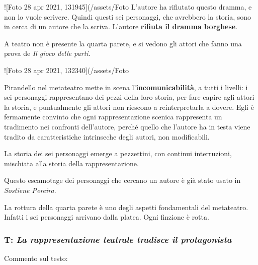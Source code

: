 ![Foto 28 apr 2021, 131945](/assets/Foto%
L’autore ha rifiutato questo dramma, e non lo vuole scrivere. Quindi questi sei personaggi, che avrebbero la storia, sono in cerca di un autore che la scriva. L’autore \textbf{rifiuta il dramma borghese}.

A teatro non è presente la quarta parete, e si vedono gli attori che fanno una prova de \textit{Il gioco delle parti}.

![Foto 28 apr 2021, 132340](/assets/Foto%

Pirandello nel metateatro mette in scena l’\textbf{incomunicabilità}, a tutti i livelli: i sei personaggi rappresentano dei pezzi della loro storia, per fare capire agli attori la storia, e puntualmente gli attori non riescono a reinterpretarla a dovere.
Egli è fermamente convinto che ogni rappresentazione scenica rappresenta un tradimento nei confronti dell’autore, perché quello che l’autore ha in testa viene tradito da caratteristiche intrinseche degli autori, non modificabili.

La storia dei sei personaggi emerge a pezzettini, con continui interruzioni, mischiata alla storia della rappresentazione.

Questo escamotage dei personaggi che cercano un autore è già stato usato in \textit{Sostiene Pereira}.

La rottura della quarta parete è uno degli aspetti fondamentali del metateatro. Infatti i sei personaggi arrivano dalla platea. Ogni finzione è rotta.

\subsubsection{T: \textit{La rappresentazione teatrale tradisce il protagonista}}

Commento sul testo:

